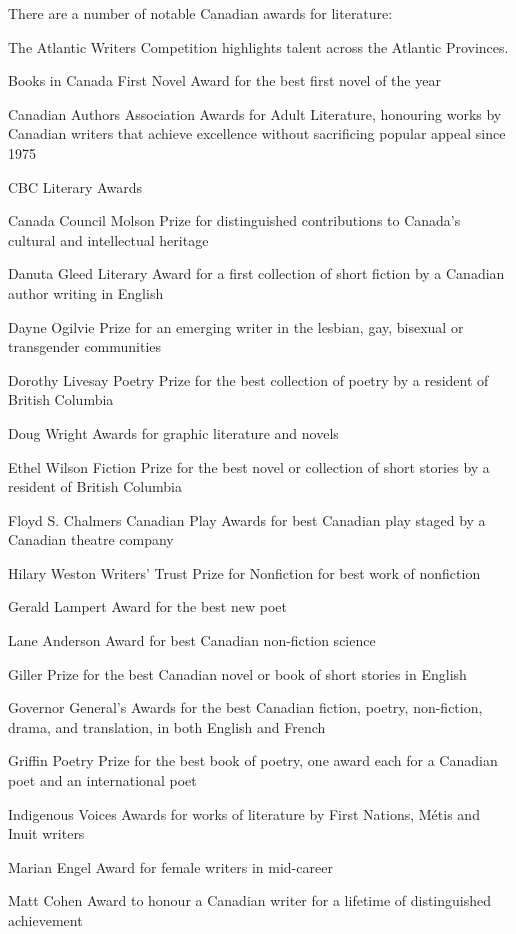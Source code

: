 There are a number of notable Canadian awards for literature:

The Atlantic Writers Competition highlights talent across the Atlantic
Provinces.

Books in Canada First Novel Award for the best first novel of the year

Canadian Authors Association Awards for Adult Literature, honouring
works by Canadian writers that achieve excellence without sacrificing
popular appeal since 1975

CBC Literary Awards

Canada Council Molson Prize for distinguished contributions to Canada's
cultural and intellectual heritage

Danuta Gleed Literary Award for a first collection of short fiction by a
Canadian author writing in English

Dayne Ogilvie Prize for an emerging writer in the lesbian, gay, bisexual
or transgender communities

Dorothy Livesay Poetry Prize for the best collection of poetry by a
resident of British Columbia

Doug Wright Awards for graphic literature and novels

Ethel Wilson Fiction Prize for the best novel or collection of short
stories by a resident of British Columbia

Floyd S. Chalmers Canadian Play Awards for best Canadian play staged by
a Canadian theatre company

Hilary Weston Writers' Trust Prize for Nonfiction for best work of
nonfiction

Gerald Lampert Award for the best new poet

Lane Anderson Award for best Canadian non-fiction science

Giller Prize for the best Canadian novel or book of short stories in
English

Governor General's Awards for the best Canadian fiction, poetry,
non-fiction, drama, and translation, in both English and French

Griffin Poetry Prize for the best book of poetry, one award each for a
Canadian poet and an international poet

Indigenous Voices Awards for works of literature by First Nations, Métis
and Inuit writers

Marian Engel Award for female writers in mid-career

Matt Cohen Award to honour a Canadian writer for a lifetime of
distinguished achievement


